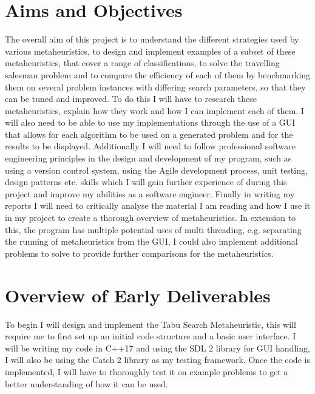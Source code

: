 \documentclass[]{final_report}
\begin{document}
\newpage
\section*{Aims and Objectives}

The overall aim of this project is to understand the different strategies used by various metaheuristics, to design and implement examples of a subset of these metaheuristics, that cover a range of classifications, to solve the travelling salesman problem and to compare the efficiency of each of them by benchmarking them on several problem instances with differing search parameters, so that they can be tuned and improved. To do this I will have to research these metaheuristics, explain how they work and how I can implement each of them. I will also need to be able to use my implementations through the use of a GUI that allows for each algorithm to be used on a generated problem and for the results to be displayed. Additionally I will need to follow professional software engineering principles in the design and development of my program, such as using a version control system, using the Agile development process, unit testing, design patterns etc. skills which I will gain further experience of during this project and improve my abilities as a software engineer. Finally in writing my reports I will need to critically analyse the material I am reading and how I use it in my project to create a thorough overview of metaheuristics. In extension to this, the program has multiple potential uses of multi threading, e.g. separating the running of metaheuristics from the GUI, I could also implement additional problems to solve to provide further comparisons for the metaheuristics.

\newpage
\section*{Overview of Early Deliverables}

To begin I will design and implement the Tabu Search Metaheuristic, this will require me to first set up an initial code structure and a basic user interface. I will be writing my code in C++17 and using the SDL 2 library for GUI handling, I will also be using the Catch 2 library as my testing framework. Once the code is implemented, I will have to thoroughly test it on example problems to get a better understanding of how it can be used.
\end{document}
